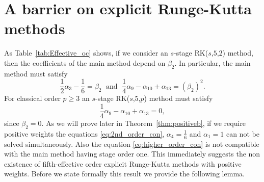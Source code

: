 \section{A barrier on explicit Runge-Kutta methods}\label{sec:ExRK_barrier}

\indent As Table~\ref{tab:Effective_oc} shows, if we consider an $s$-stage RK($s$,$5$,$2$) method, then the coefficients of the main method depend on $\beta_2$. In particular, the main method must satisfy
\begin{equation}\label{eq:2nd_order_con}
    \frac{1}{2}\alpha_3 - \frac{1}{6} = \beta_2 \; \text{ and } \; \frac{1}{4}\alpha_9 - \alpha_{10} + \alpha_{13} = (\beta_2)^2.
\end{equation}
For classical order $p \geq 3$ an $s$-stage RK($s$,$5$,$p$) method must satisfy
\begin{equation}\label{eq:higher_order_con}
    \frac{1}{4}\alpha_9- \alpha_{10} + \alpha_{13} = 0,
\end{equation}
since $\beta_2 = 0$. As we will prove later in Theorem~\ref{thm:positiveb}, if we require positive weights the equations \eqref{eq:2nd_order_con}, $\alpha_4 = \frac{1}{6}$ and $\alpha_1 = 1$ can not be solved simultaneously. Also the equation \eqref{eq:higher_order_con} is not compatible with the main method having stage order one. This immediately suggests the non existence of fifth-effective order explicit Runge-Kutta methods with positive weights.
Before we state formally this result we provide the following lemma.

